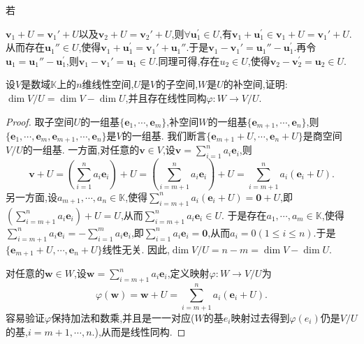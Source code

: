 \documentclass[../../main.tex]{subfiles}%
\begin{document}
\begin{remark}
\hypertarget{remark1陪集}{若}\(\boldsymbol{v}_1 + U=\boldsymbol{v}_1'+U\)以及\(\boldsymbol{v}_2 + U=\boldsymbol{v}_2'+U\),则$\forall \boldsymbol{u}_{1}^{\prime}\in U$,有$\boldsymbol{v}_1+\boldsymbol{u}_{1}^{\prime}\in \boldsymbol{v}_1 + U = \boldsymbol{v}_1' + U$.从而存在$\boldsymbol{u}_{1}''\in U$,使得$\boldsymbol{v}_1+\boldsymbol{u}_{1}^{\prime}=\boldsymbol{v}_1'+\boldsymbol{u}_{1}''$.于是$\boldsymbol{v}_1 - \boldsymbol{v}_1'=\boldsymbol{u}_{1}''-\boldsymbol{u}_{1}^{\prime}$.再令$\boldsymbol{u}_1=\boldsymbol{u}_{1}''-\boldsymbol{u}_{1}^{\prime}$,则$\boldsymbol{v}_1 - \boldsymbol{v}_1'=\boldsymbol{u}_1\in U$.同理可得,存在$u_2\in U$,使得$\boldsymbol{v}_2-\boldsymbol{v}_{2}^{\prime}=\boldsymbol{u}_2\in U$.
\end{remark}


\begin{proposition}[商空间的维数公式和商空间与补空间同构]\label{proposition:商空间的维数公式和商空间与补空间同构}
设\(V\)是数域\(\mathbb{K}\)上的\(n\)维线性空间,\(U\)是\(V\)的子空间,\(W\)是\(U\)的补空间,证明:\(\dim V/U=\dim V-\dim U\),并且存在线性同构\(\varphi:W\to V/U\).
\end{proposition}
\begin{proof}
取子空间\(U\)的一组基\(\{\boldsymbol{e}_1,\cdots,\boldsymbol{e}_m\}\),补空间\(W\)的一组基\(\{\boldsymbol{e}_{m + 1},\cdots,\boldsymbol{e}_n\}\),则\(\{\boldsymbol{e}_1,\cdots,\boldsymbol{e}_m,\boldsymbol{e}_{m + 1},\cdots,\boldsymbol{e}_n\}\)是\(V\)的一组基. 我们断言\(\{\boldsymbol{e}_{m + 1}+U,\cdots,\boldsymbol{e}_n+U\}\)是商空间\(V/U\)的一组基. 一方面,对任意的\(\boldsymbol{v}\in V\),设\(\boldsymbol{v}=\sum_{i = 1}^{n}a_i\boldsymbol{e}_i\),则
\[
\boldsymbol{v}+U=\left(\sum_{i = 1}^{n}a_i\boldsymbol{e}_i\right)+U=\left(\sum_{i = m + 1}^{n}a_i\boldsymbol{e}_i\right)+U=\sum_{i = m + 1}^{n}a_i(\boldsymbol{e}_i+U).
\]
另一方面,设\(a_{m + 1},\cdots,a_n\in\mathbb{K}\),使得\(\sum_{i = m + 1}^{n}a_i(\boldsymbol{e}_i+U)=\boldsymbol{0}+U\),即\(\left(\sum_{i = m + 1}^{n}a_i\boldsymbol{e}_i\right)+U = U\),从而\(\sum_{i = m + 1}^{n}a_i\boldsymbol{e}_i\in U\). 于是存在\(a_1,\cdots,a_m\in\mathbb{K}\),使得\(\sum_{i = m + 1}^{n}a_i\boldsymbol{e}_i=-\sum_{i = 1}^{m}a_i\boldsymbol{e}_i\),即\(\sum_{i = 1}^{n}a_i\boldsymbol{e}_i=\boldsymbol{0}\),从而\(a_i = 0(1\leqslant  i\leqslant  n)\).于是\(\{\boldsymbol{e}_{m + 1}+U,\cdots,\boldsymbol{e}_n+U\}\)线性无关. 因此,\(\dim V/U=n - m=\dim V-\dim U\).

对任意的\(\boldsymbol{w}\in W\),设\(\boldsymbol{w}=\sum_{i = m + 1}^{n}a_i\boldsymbol{e}_i\),定义映射\(\varphi:W\to V/U\)为
\[
\varphi(\boldsymbol{w})=\boldsymbol{w}+U=\sum_{i = m + 1}^{n}a_i(\boldsymbol{e}_i+U).
\]
容易验证\(\varphi\)保持加法和数乘,并且是一一对应($W$的基$e_i$映射过去得到$\varphi(e_i)$仍是$V/U$的基,$i=m+1,\cdots,n$.),从而是线性同构. 
\end{proof}
\end{document}
